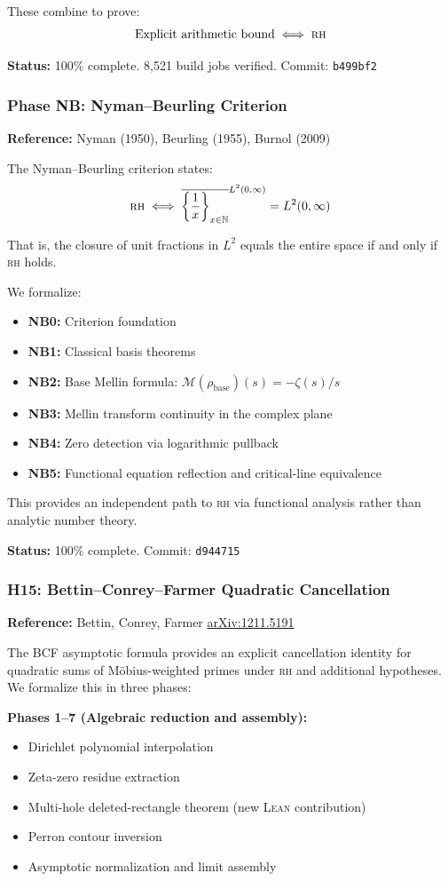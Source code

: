 \documentclass[11pt,a4paper]{article}
\newcommand{\RH}{\textsc{rh}\xspace}
\newcommand{\Lean}{\textsc{Lean}\xspace}
\newcommand{\commit}[1]{{\small\texttt{#1}}}
\newcommand{\arxiv}[1]{\href{https://arxiv.org/abs/#1}{arXiv:#1}}
\begin{document}
These combine to prove:
\[
  \text{Explicit arithmetic bound} \iff \text{\RH}
\]

\textbf{Status:} 100\% complete. 8,521 build jobs verified. Commit: \commit{b499bf2}

\subsubsection{Phase NB: Nyman--Beurling Criterion}

\textbf{Reference:} Nyman (1950), Beurling (1955), Burnol (2009)

The Nyman--Beurling criterion states:
\[
  \text{\RH} \iff \overline{\left\{\frac{1}{x}\right\}_{x \in \mathbb{N}}}^{L^2(0,\infty)} = L^2(0,\infty)
\]

That is, the closure of unit fractions in $L^2$ equals the entire space if and only if \RH holds.

We formalize:
\begin{itemize}
  \item \textbf{NB0:} Criterion foundation
  \item \textbf{NB1:} Classical basis theorems
  \item \textbf{NB2:} Base Mellin formula: $\mathcal{M}(\rho_{\text{base}})(s) = -\zeta(s)/s$
  \item \textbf{NB3:} Mellin transform continuity in the complex plane
  \item \textbf{NB4:} Zero detection via logarithmic pullback
  \item \textbf{NB5:} Functional equation reflection and critical-line equivalence
\end{itemize}

This provides an independent path to \RH via functional analysis rather than analytic number theory.

\textbf{Status:} 100\% complete. Commit: \commit{d944715}

\subsubsection{H15: Bettin--Conrey--Farmer Quadratic Cancellation}

\textbf{Reference:} Bettin, Conrey, Farmer \arxiv{1211.5191}

The BCF asymptotic formula provides an explicit cancellation identity for quadratic sums of Möbius-weighted primes under \RH and additional hypotheses. We formalize this in three phases:

\textbf{Phases 1--7 (Algebraic reduction and assembly):}
\begin{itemize}
  \item Dirichlet polynomial interpolation
  \item Zeta-zero residue extraction
  \item Multi-hole deleted-rectangle theorem (new \Lean contribution)
  \item Perron contour inversion
  \item Asymptotic normalization and limit assembly
\end{itemize}
\end{document}
